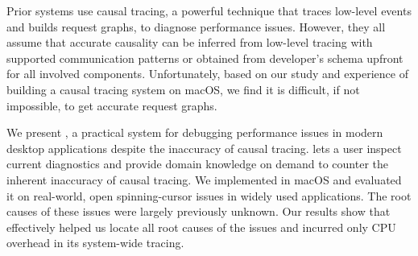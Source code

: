 Prior systems use causal tracing, a powerful technique that traces low-level
events and builds request graphs, to diagnose performance issues. However, they
all assume that accurate causality can be inferred from low-level tracing with
supported communication patterns or obtained from developer's schema upfront
for all involved components.  Unfortunately, based on our study and experience
of building a causal tracing system on macOS, we find it is difficult, if not
impossible, to get accurate request graphs.


We present \xxx, a practical system for debugging performance issues in modern
desktop applications despite the inaccuracy of causal tracing. \xxx lets a user
inspect current diagnostics and provide domain knowledge on demand to counter
the inherent inaccuracy of causal tracing. We implemented \xxx in macOS and
evaluated it on \nbug real-world, open spinning-cursor issues in widely used
applications. The root causes of these issues were largely previously unknown.
Our results show that \xxx effectively helped us locate all root causes of the
issues and incurred only \cpuoverhead CPU overhead in its system-wide tracing.

